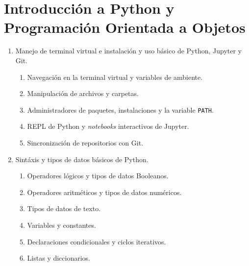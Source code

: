 \documentclass[a4paper]{article}
\begin{document}
\setcounter{section}{-1}

\section{Introducción a Python y Programación Orientada a Objetos} \label{Sec: Introducción a Python y Programación Orientada a Objetos} 

\begin{enumerate}[label=\arabic*.]

    \item Manejo de terminal virtual e instalación y uso básico de Python, Jupyter y Git.
    \begin{enumerate}[label=1.\arabic*]
    
        \item Navegación en la terminal virtual y variables de ambiente.

        \item Manipulación de archivos y carpetas.

        \item Administradores de paquetes, instalaciones y la variable \texttt{PATH}.

        \item REPL de Python y \emph{notebooks} interactivos de Jupyter.

        \item Sincronización de repositorios con Git.
    \end{enumerate}

    \item Sintáxis y tipos de datos básicos de Python.
    \begin{enumerate}[label=2.\arabic*]
    
        \item Operadores lógicos y tipos de datos Booleanos.

        \item Operadores aritméticos y tipos de datos numéricos.

        \item Tipos de datos de texto.

        \item Variables y constantes.

        \item Declaraciones condicionales y ciclos iterativos.

        \item Listas y diccionarios.
    \end{enumerate}


\end{enumerate}
\end{document}
